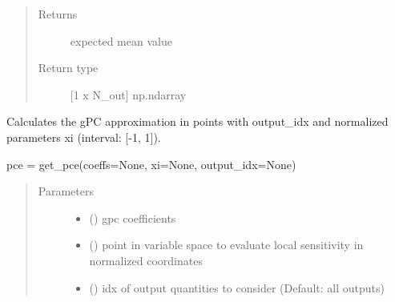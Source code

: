 \documentclass[letterpaper,10pt,english,openany,oneside]{sphinxmanual}
\begin{document}
\begin{fulllineitems}
\begin{fulllineitems}
\begin{quote}
\begin{description}
\item[{Returns}] \leavevmode
{} \textendash{} expected mean value

\item[{Return type}] \leavevmode
{[}1 x N\_out{]} np.ndarray

\end{description}\end{quote}

\end{fulllineitems}


\begin{fulllineitems}
\label{\detokenize{pygpc:pygpc.gpc.gPC.get_pce}}
Calculates the gPC approximation in points with output\_idx and normalized parameters xi (interval: {[}-1, 1{]}).

pce = get\_pce(coeffs=None, xi=None, output\_idx=None)
\begin{quote}\begin{description}
\item[{Parameters}] \leavevmode\begin{itemize}
\item {} 
 (\sphinxstyleliteralemphasis{\sphinxupquote{{[}}}\sphinxstyleliteralemphasis{\sphinxupquote{{]} }}\sphinxstyleliteralemphasis{\sphinxupquote{, }}\sphinxstyleliteralemphasis{\sphinxupquote{, }}) \textendash{} gpc coefficients

\item {} 
 (\sphinxstyleliteralemphasis{\sphinxupquote{{[}}}\sphinxstyleliteralemphasis{\sphinxupquote{{]} }}\sphinxstyleliteralemphasis{\sphinxupquote{, }}\sphinxstyleliteralemphasis{\sphinxupquote{, }}) \textendash{} point in variable space to evaluate local sensitivity in normalized coordinates

\item {} 
 (\sphinxstyleliteralemphasis{\sphinxupquote{{[}}}\sphinxstyleliteralemphasis{\sphinxupquote{{]} }}\sphinxstyleliteralemphasis{\sphinxupquote{, }}\sphinxstyleliteralemphasis{\sphinxupquote{, }}) \textendash{} idx of output quantities to consider (Default: all outputs)


\end{itemize}
\end{description}
\end{quote}
\end{fulllineitems}
\end{fulllineitems}
\end{document}
